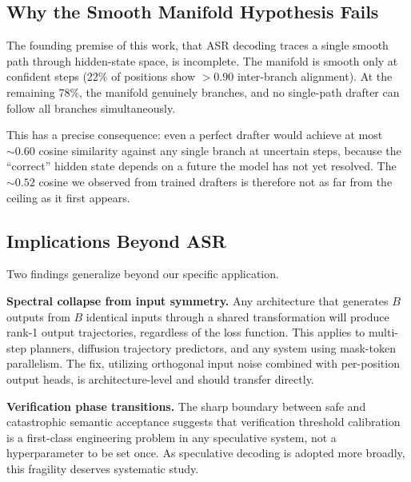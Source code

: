 \documentclass[11pt,a4paper]{article}
\begin{document}
\subsection{Why the Smooth Manifold Hypothesis Fails}

The founding premise of this work, that ASR decoding traces a single smooth path through hidden-state space, is incomplete.
The manifold is smooth only at confident steps (22\% of positions show $>0.90$ inter-branch alignment).
At the remaining 78\%, the manifold genuinely branches, and no single-path drafter can follow all branches simultaneously.

This has a precise consequence: even a perfect drafter would achieve at most ${\sim}0.60$ cosine similarity against any single branch at uncertain steps, because the ``correct'' hidden state depends on a future the model has not yet resolved.
The ${\sim}0.52$ cosine we observed from trained drafters is therefore not as far from the ceiling as it first appears.

\subsection{Implications Beyond ASR}

Two findings generalize beyond our specific application.

\textbf{Spectral collapse from input symmetry.}
Any architecture that generates $B$ outputs from $B$ identical inputs through a shared transformation will produce rank-1 output trajectories, regardless of the loss function.
This applies to multi-step planners, diffusion trajectory predictors, and any system using mask-token parallelism.
The fix, utilizing orthogonal input noise combined with per-position output heads, is architecture-level and should transfer directly.

\textbf{Verification phase transitions.}
The sharp boundary between safe and catastrophic semantic acceptance suggests that verification threshold calibration is a first-class engineering problem in any speculative system, not a hyperparameter to be set once.
As speculative decoding is adopted more broadly, this fragility deserves systematic study.
\end{document}
